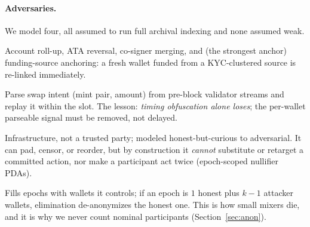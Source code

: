 \documentclass[10pt]{article}
\begin{document}
\paragraph{Adversaries.} We model four, all assumed to run full archival
indexing and none assumed weak.
\begin{description}[leftmargin=1.4em,itemsep=0.12em]
  \item[A1 Chain-analysis clustering.] Account roll-up, ATA reversal, co-signer
        merging, and (the strongest anchor) funding-source anchoring: a fresh
        wallet funded from a KYC-clustered source is re-linked immediately.
  \item[A2 Copy-traders / shadowers.] Parse swap intent (mint pair, amount) from
        pre-block validator streams and replay it within the slot. The lesson:
        \emph{timing obfuscation alone loses}; the per-wallet parseable signal
        must be removed, not delayed.
  \item[A3 The pool operator.] Infrastructure, not a trusted party; modeled
        honest-but-curious to adversarial. It can pad, censor, or reorder, but by
        construction it \emph{cannot} substitute or retarget a committed action,
        nor make a participant act twice (epoch-scoped nullifier PDAs).
  \item[A4 Sybil attacker.] Fills epochs with wallets it controls; if an epoch is
        $1$ honest plus $k{-}1$ attacker wallets, elimination de-anonymizes the
        honest one. This is how small mixers die, and it is why we never count
        nominal participants (Section~\ref{sec:anon}).
\end{description}
\end{document}
